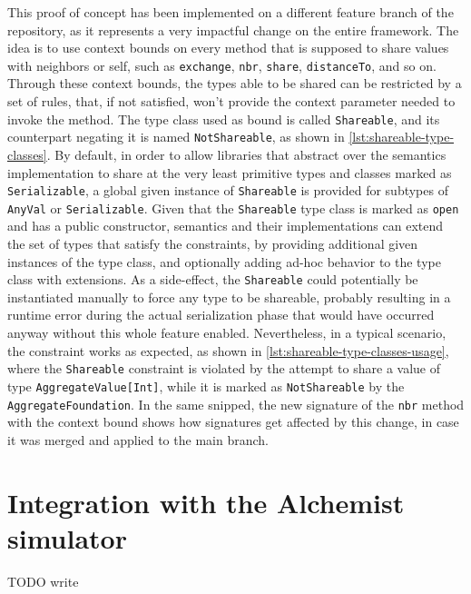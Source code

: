 This proof of concept has been implemented on a different feature branch of the repository, as it represents a very impactful change on the entire framework.
%
The idea is to use context bounds on every method that is supposed to share values with neighbors or self, such as \texttt{exchange}, \texttt{nbr}, \texttt{share}, \texttt{distanceTo}, and so on.
%
Through these context bounds, the types able to be shared can be restricted by a set of rules, that, if not satisfied, won't provide the context parameter needed to invoke the method.
%
The type class used as bound is called \texttt{Shareable}, and its counterpart negating it is named \texttt{NotShareable}, as shown in \cref{lst:shareable-type-classes}.
%
By default, in order to allow libraries that abstract over the semantics implementation to share at the very least primitive types and classes marked as \texttt{Serializable}, a global given instance of \texttt{Shareable} is provided for subtypes of \texttt{AnyVal} or \texttt{Serializable}.
%
Given that the \texttt{Shareable} type class is marked as \texttt{open} and has a public constructor, semantics and their implementations can extend the set of types that satisfy the constraints, by providing additional given instances of the type class, and optionally adding ad-hoc behavior to the type class with extensions.
%
As a side-effect, the \texttt{Shareable} could potentially be instantiated manually to force any type to be shareable, probably resulting in a runtime error during the actual serialization phase that would have occurred anyway without this whole feature enabled.
%
Nevertheless, in a typical scenario, the constraint works as expected, as shown in \cref{lst:shareable-type-classes-usage}, where the \texttt{Shareable} constraint is violated by the attempt to share a value of type \texttt{AggregateValue[Int]}, while it is marked as \texttt{NotShareable} by the \texttt{AggregateFoundation}.
%
In the same snipped, the new signature of the \texttt{nbr} method with the context bound shows how signatures get affected by this change, in case it was merged and applied to the main branch.





\section{Integration with the Alchemist simulator}

TODO write
